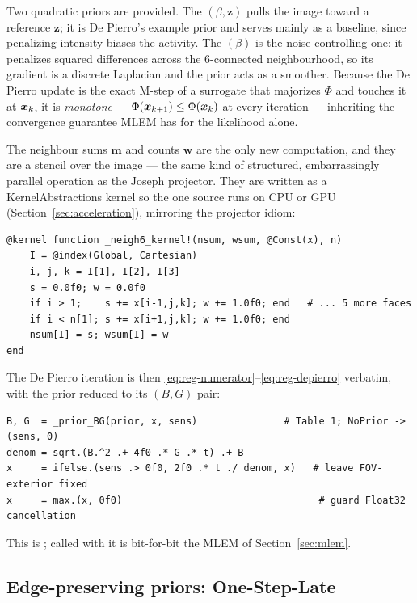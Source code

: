 Two quadratic priors are provided. The $(\beta,\bm
z)$ pulls the image toward a reference $\bm z$; it is De Pierro's example prior and
serves mainly as a baseline, since penalizing intensity biases the activity. The
$(\beta)$ is the noise-controlling one: it penalizes
squared differences across the 6-connected neighbourhood, so its gradient is a
discrete Laplacian and the prior acts as a smoother. Because the De Pierro update
is the exact M-step of a surrogate that majorizes $\Phi$ and touches it at $\bm{x}_k$,
it is \emph{monotone} --- $\Phi(\bm{x}_{k+1})\le\Phi(\bm{x}_k)$ at every iteration ---
inheriting the convergence guarantee MLEM has for the likelihood alone.

The neighbour sums $\bm m$ and counts $\bm w$ are the only new computation, and
they are a stencil over the image --- the same kind of structured, embarrassingly
parallel operation as the Joseph projector. They are written as a
KernelAbstractions kernel so the one source runs on CPU or GPU
(Section~\ref{sec:acceleration}), mirroring the projector idiom:
\begin{lstlisting}
@kernel function _neigh6_kernel!(nsum, wsum, @Const(x), n)
    I = @index(Global, Cartesian)
    i, j, k = I[1], I[2], I[3]
    s = 0.0f0; w = 0.0f0
    if i > 1;    s += x[i-1,j,k]; w += 1.0f0; end   # ... 5 more faces
    if i < n[1]; s += x[i+1,j,k]; w += 1.0f0; end
    nsum[I] = s; wsum[I] = w
end
\end{lstlisting}
The De Pierro iteration is then \eqref{eq:reg-numerator}--\eqref{eq:reg-depierro}
verbatim, with the prior reduced to its $(B,G)$ pair:
\begin{lstlisting}
B, G  = _prior_BG(prior, x, sens)               # Table 1; NoPrior -> (sens, 0)
denom = sqrt.(B.^2 .+ 4f0 .* G .* t) .+ B
x     = ifelse.(sens .> 0f0, 2f0 .* t ./ denom, x)   # leave FOV-exterior fixed
x     = max.(x, 0f0)                                  # guard Float32 cancellation
\end{lstlisting}
This is ; called with  it is bit-for-bit the
MLEM of Section~\ref{sec:mlem}.

\subsection{Edge-preserving priors: One-Step-Late}
\label{sec:reg:osl}

